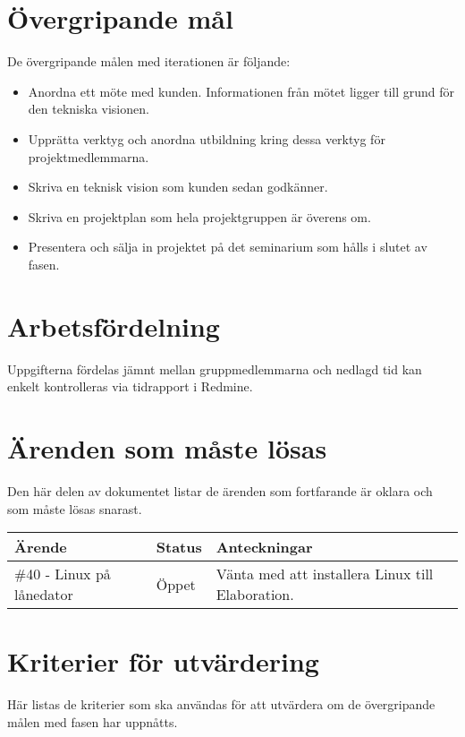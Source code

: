 \section{Övergripande mål}
De övergripande målen med iterationen är följande:

\begin{itemize}
	\item Anordna ett möte med kunden. Informationen från mötet ligger till grund för den tekniska visionen.
	\item Upprätta verktyg och anordna utbildning kring dessa verktyg för projektmedlemmarna.
	\item Skriva en teknisk vision som kunden sedan godkänner.
	\item Skriva en projektplan som hela projektgruppen är överens om.
	\item Presentera och sälja in projektet på det seminarium som hålls i slutet av fasen.
\end{itemize}

\section{Arbetsfördelning}
Uppgifterna fördelas jämnt mellan gruppmedlemmarna och nedlagd tid kan enkelt kontrolleras via tidrapport i Redmine.

\section{Ärenden som måste lösas}
Den här delen av dokumentet listar de ärenden som fortfarande är oklara och som måste lösas snarast.

\begin{center}
	\begin{tabular}{| l | l | l |}
		\hline Ärende & Status & Anteckningar \\
		\hline \#40 - Linux på lånedator & Öppet & Vänta med att installera Linux till Elaboration. \\
		\hline
	\end{tabular}
\end{center}

\section{Kriterier för utvärdering}
Här listas de kriterier som ska användas för att utvärdera om de övergripande målen med fasen har uppnåtts.

